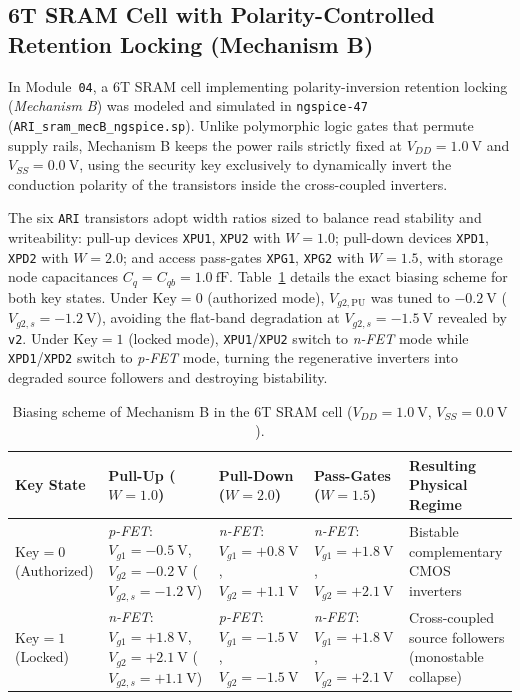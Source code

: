 \subsection{6T SRAM Cell with Polarity-Controlled Retention Locking (Mechanism B)}\label{sec:met_sram}

In Module~\texttt{04}, a 6T SRAM cell implementing polarity-inversion retention locking (\textit{Mechanism B}) was modeled and simulated in \texttt{ngspice-47} (\texttt{ARI\_sram\_mecB\_ngspice.sp}). Unlike polymorphic logic gates that permute supply rails, Mechanism B keeps the power rails strictly fixed at $V_{DD} = 1.0\ \text{V}$ and $V_{SS} = 0.0\ \text{V}$, using the security key exclusively to dynamically invert the conduction polarity of the transistors inside the cross-coupled inverters.

The six \texttt{ARI} transistors adopt width ratios sized to balance read stability and writeability: pull-up devices \texttt{XPU1}, \texttt{XPU2} with $W = 1.0$; pull-down devices \texttt{XPD1}, \texttt{XPD2} with $W = 2.0$; and access pass-gates \texttt{XPG1}, \texttt{XPG2} with $W = 1.5$, with storage node capacitances $C_q = C_{qb} = 1.0\ \text{fF}$. Table~\ref{tab:sram_biases} details the exact biasing scheme for both key states. Under $\text{Key} = 0$ (authorized mode), $V_{g2,\mathrm{PU}}$ was tuned to $-0.2\ \text{V}$ ($V_{g2,s} = -1.2\ \text{V}$), avoiding the flat-band degradation at $V_{g2,s} = -1.5\ \text{V}$ revealed by \texttt{v2}. Under $\text{Key} = 1$ (locked mode), \texttt{XPU1}/\texttt{XPU2} switch to \textit{n-FET} mode while \texttt{XPD1}/\texttt{XPD2} switch to \textit{p-FET} mode, turning the regenerative inverters into degraded source followers and destroying bistability.

\begin{table}[htbp]
\centering
\caption{Biasing scheme of Mechanism B in the 6T SRAM cell ($V_{DD}=1.0\ \text{V}$, $V_{SS}=0.0\ \text{V}$).}
\label{tab:sram_biases}
\footnotesize
\begin{tabularx}{\textwidth}{>{\raggedright\arraybackslash}p{2.3cm} >{\raggedright\arraybackslash}p{3.1cm} >{\raggedright\arraybackslash}p{2.9cm} >{\raggedright\arraybackslash}p{2.9cm} >{\raggedright\arraybackslash}X}
\toprule
\textbf{Key State} & \textbf{Pull-Up ($W=1.0$)} & \textbf{Pull-Down ($W=2.0$)} & \textbf{Pass-Gates ($W=1.5$)} & \textbf{Resulting Physical Regime} \\
\midrule
$\text{Key}=0$ (Authorized) & \textit{p-FET}: $V_{g1}=-0.5\ \text{V}$, $V_{g2}=-0.2\ \text{V}$ ($V_{g2,s}=-1.2\ \text{V}$) & \textit{n-FET}: $V_{g1}=+0.8\ \text{V}$, $V_{g2}=+1.1\ \text{V}$ & \textit{n-FET}: $V_{g1}=+1.8\ \text{V}$, $V_{g2}=+2.1\ \text{V}$ & Bistable complementary CMOS inverters \\
$\text{Key}=1$ (Locked) & \textit{n-FET}: $V_{g1}=+1.8\ \text{V}$, $V_{g2}=+2.1\ \text{V}$ ($V_{g2,s}=+1.1\ \text{V}$) & \textit{p-FET}: $V_{g1}=-1.5\ \text{V}$, $V_{g2}=-1.5\ \text{V}$ & \textit{n-FET}: $V_{g1}=+1.8\ \text{V}$, $V_{g2}=+2.1\ \text{V}$ & Cross-coupled source followers (monostable collapse) \\
\bottomrule
\end{tabularx}
\end{table}

